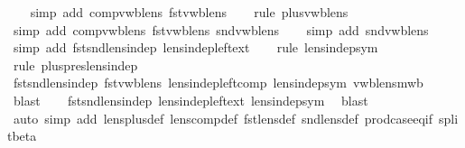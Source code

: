 \begin{isabellebody}
\ \ \isamarkupfalse%
\ {\isacharparenleft}simp\ add{\isacharcolon}\ comp{\isacharunderscore}vwb{\isacharunderscore}lens\ fst{\isacharunderscore}vwb{\isacharunderscore}lens{\isacharparenright}\isanewline
\ \ \isamarkupfalse%
\ {\isacharparenleft}rule\ plus{\isacharunderscore}vwb{\isacharunderscore}lens{\isacharparenright}\isanewline
\ \ \isamarkupfalse%
\ {\isacharparenleft}simp\ add{\isacharcolon}\ comp{\isacharunderscore}vwb{\isacharunderscore}lens\ fst{\isacharunderscore}vwb{\isacharunderscore}lens\ snd{\isacharunderscore}vwb{\isacharunderscore}lens{\isacharparenright}\isanewline
\ \ \isamarkupfalse%
\ {\isacharparenleft}simp\ add{\isacharcolon}\ snd{\isacharunderscore}vwb{\isacharunderscore}lens{\isacharparenright}\isanewline
\ \ \isamarkupfalse%
\ {\isacharparenleft}simp\ add{\isacharcolon}\ fst{\isacharunderscore}snd{\isacharunderscore}lens{\isacharunderscore}indep\ lens{\isacharunderscore}indep{\isacharunderscore}left{\isacharunderscore}ext{\isacharparenright}\isanewline
\ \ \isamarkupfalse%
\ {\isacharparenleft}rule\ lens{\isacharunderscore}indep{\isacharunderscore}sym{\isacharparenright}\isanewline
\ \ \isamarkupfalse%
\ {\isacharparenleft}rule\ plus{\isacharunderscore}pres{\isacharunderscore}lens{\isacharunderscore}indep{\isacharparenright}\isanewline
\ \ \isamarkupfalse%
\ fst{\isacharunderscore}snd{\isacharunderscore}lens{\isacharunderscore}indep\ fst{\isacharunderscore}vwb{\isacharunderscore}lens\ lens{\isacharunderscore}indep{\isacharunderscore}left{\isacharunderscore}comp\ lens{\isacharunderscore}indep{\isacharunderscore}sym\ vwb{\isacharunderscore}lens{\isacharunderscore}mwb\ \isamarkupfalse%
\ blast\isanewline
\ \ \isamarkupfalse%
\ fst{\isacharunderscore}snd{\isacharunderscore}lens{\isacharunderscore}indep\ lens{\isacharunderscore}indep{\isacharunderscore}left{\isacharunderscore}ext\ lens{\isacharunderscore}indep{\isacharunderscore}sym\ \isamarkupfalse%
\ blast\isanewline
\ \ \isamarkupfalse%
\ {\isacharparenleft}auto\ simp\ add{\isacharcolon}\ lens{\isacharunderscore}plus{\isacharunderscore}def\ lens{\isacharunderscore}comp{\isacharunderscore}def\ fst{\isacharunderscore}lens{\isacharunderscore}def\ snd{\isacharunderscore}lens{\isacharunderscore}def\ prod{\isachardot}case{\isacharunderscore}eq{\isacharunderscore}if\ split{\isacharunderscore}beta{\isacharprime}{\isacharparenright}{\isacharbrackleft}{}{\isacharbrackright}\isanewline

\end{isabellebody}
